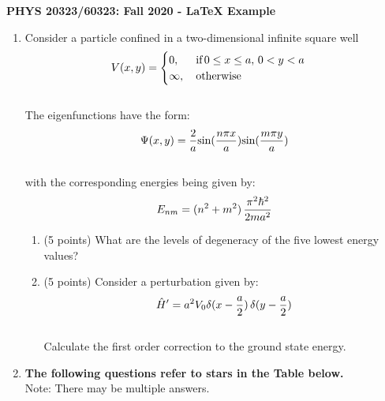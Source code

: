 \documentclass[12pt]{article}
\begin{document}
\def\pos{\medskip\quad}
\def\subpos{\smallskip \qquad}

\begin{center}
{\large
\textbf{PHYS  20323/60323: Fall 2020 - LaTeX Example}}\\
\end{center}

\vskip0.1in
\begin{enumerate}      %
\item Consider a particle confined in a two-dimensional infinite square well
\begin{equation*}
V(x,y)=
\begin{cases}
0, \,\,\,\quad \textrm{if} \, 0 \leq x \leq a, \, 0<y<a\\
\infty, \quad \textrm{otherwise}$$
\end{cases}
\end{equation*}
\\The eigenfunctions have the form:
\begin{equation*}
\\ \Psi(x,y) = \frac{2}{a} \textrm{sin}(\frac{n\pi x}{a}) \textrm{sin}(\frac{m\pi y}{a})
\end{equation*}
\\with the corresponding energies being given by:
\begin{equation*}
\\E_{nm}=(n^2+m^2)\,\frac{\pi^2 \hbar^2}{2ma^2}
\end{equation*}
\begin{enumerate}     %
\item (5 points) What are the levels of degeneracy of the five lowest energy values?
\item (5 points) Consider a perturbation given by:
\begin{equation*}
\\\hat{H}'=a^2V_{0}\delta(x-\frac{a}{2})\, \delta(y-\frac{a}{2})
\end{equation*}
\\Calculate the first order correction to the ground state energy.
\end{enumerate}       %
\vskip0.1in
\item \textbf{The following questions refer to stars in the Table below.}     
\\Note: There may be multiple answers.


\end{enumerate}
\end{document}
